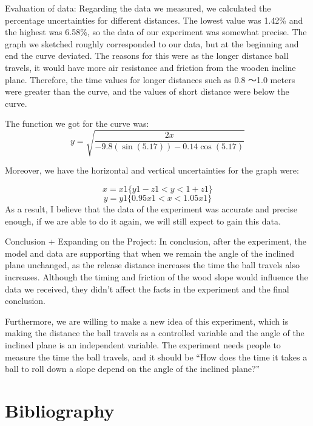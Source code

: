\documentclass[12pt]{report}
\begin{document}
Evaluation of data:
Regarding the data we measured, we calculated the percentage uncertainties for different distances. The lowest value was 1.42\% and the highest was 6.58\%, so the data of our experiment was somewhat precise. The graph we sketched roughly corresponded to our data, but at the beginning and end the curve deviated. The reasons for this were as the longer distance ball travels, it would have more air resistance and friction from the wooden incline plane. Therefore, the time values for longer distances such as 0.8 ～1.0 meters were greater than the curve, and the values of short distance were below the curve.

The function we got for the curve was:
\[ y = \sqrt{\frac{2x}{-9.8(\sin(5.17))-0.14\cos(5.17)}}\]

Moreover, we have the horizontal and vertical uncertainties for the graph were:

\[x = x{1}\{y{1}-z{1}<y<{1}+z{1}\}\]
\[y = y{1}\{0.95x{1}<x<1.05x{1}\}\]
As a result, I believe that the data of the experiment was accurate and precise enough, if we are able to do it again, we will still expect to gain this data.

Conclusion + Expanding on the Project:
In conclusion, after the experiment, the model and data are supporting that when we remain the angle of the inclined plane unchanged, as the release distance increases the time the ball travels also increases. Although the timing and friction of the wood slope would influence the data we received, they didn’t affect the facts in the experiment and the final conclusion.

Furthermore, we are willing to make a new idea of this experiment, which is making the distance the ball travels as a controlled variable and the angle of the inclined plane is an independent variable. The experiment needs people to measure the time the ball travels, and it should be “How does the time it takes a ball to roll down a slope depend on the angle of the inclined plane?”
\section{Bibliography}
\end{document}
